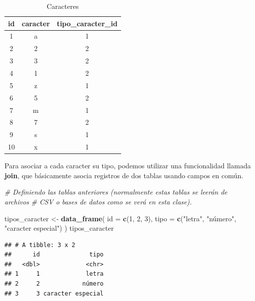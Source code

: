 \documentclass[]{book}
\newenvironment{Shaded}{\begin{snugshade}}{\end{snugshade}}
\newcommand{\KeywordTok}[1]{\textcolor[rgb]{0.13,0.29,0.53}{\textbf{#1}}}
\newcommand{\DataTypeTok}[1]{\textcolor[rgb]{0.13,0.29,0.53}{#1}}
\newcommand{\DecValTok}[1]{\textcolor[rgb]{0.00,0.00,0.81}{#1}}
\newcommand{\StringTok}[1]{\textcolor[rgb]{0.31,0.60,0.02}{#1}}
\newcommand{\CommentTok}[1]{\textcolor[rgb]{0.56,0.35,0.01}{\textit{#1}}}
\newcommand{\NormalTok}[1]{#1}
\theoremstyle{definition}
\theoremstyle{definition}
\theoremstyle{definition}
\theoremstyle{remark}
\begin{document}
\begin{table}

\caption{\label{tab:unnamed-chunk-29}Caracteres}
\centering
\begin{tabular}[t]{c|c|c}
\hline
id & caracter & tipo\_caracter\_id\\
\hline
1 & a & 1\\
\hline
2 & 2 & 2\\
\hline
3 & 3 & 2\\
\hline
4 & 1 & 2\\
\hline
5 & z & 1\\
\hline
6 & 5 & 2\\
\hline
7 & m & 1\\
\hline
8 & 7 & 2\\
\hline
9 & s & 1\\
\hline
10 & x & 1\\
\hline
\end{tabular}
\end{table}

Para asociar a cada caracter su tipo, podemos utilizar una funcionalidad
llamada \textbf{join}, que básicamente asocia registros de dos tablas
usando campos en común.

\begin{Shaded}
\begin{Highlighting}[]
\CommentTok{# Definiendo las tablas anteriores (normalmente estas tablas se leerán de archivos}
\CommentTok{# CSV o bases de datos como se verá en esta clase).}

\NormalTok{tipos_caracter <-}\StringTok{ }\KeywordTok{data_frame}\NormalTok{(}
  \DataTypeTok{id =} \KeywordTok{c}\NormalTok{(}\DecValTok{1}\NormalTok{, }\DecValTok{2}\NormalTok{, }\DecValTok{3}\NormalTok{),}
  \DataTypeTok{tipo =} \KeywordTok{c}\NormalTok{(}\StringTok{"letra"}\NormalTok{, }\StringTok{"número", "}\NormalTok{caracter especial}\StringTok{")}
\StringTok{)}
\StringTok{tipos_caracter}
\end{Highlighting}
\end{Shaded}

\begin{verbatim}
## # A tibble: 3 x 2
##      id              tipo
##   <dbl>             <chr>
## 1     1             letra
## 2     2            número
## 3     3 caracter especial
\end{verbatim}
\end{document}
